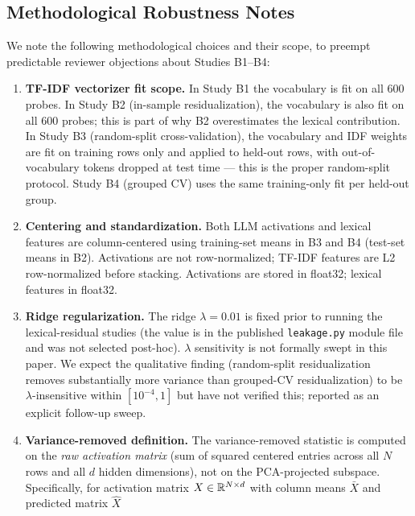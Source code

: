 \subsection{Methodological Robustness Notes}
\label{sec:methods-robustness}

We note the following methodological choices and their scope, to
preempt predictable reviewer objections about Studies B1--B4:

\begin{enumerate}
    \item \textbf{TF-IDF vectorizer fit scope.} In Study B1 the
        vocabulary is fit on all $600$ probes. In Study B2 (in-sample
        residualization), the vocabulary is also fit on all $600$
        probes; this is part of why B2 overestimates the lexical
        contribution. In Study B3 (random-split cross-validation),
        the vocabulary and IDF weights are fit on training rows only
        and applied to held-out rows, with out-of-vocabulary tokens
        dropped at test time --- this is the proper random-split
        protocol. Study B4 (grouped CV) uses the same training-only
        fit per held-out group.
    \item \textbf{Centering and standardization.} Both LLM activations
        and lexical features are column-centered using training-set
        means in B3 and B4 (test-set means in B2). Activations are
        not row-normalized; TF-IDF features are L2 row-normalized
        before stacking. Activations are stored in float32; lexical
        features in float32.
    \item \textbf{Ridge regularization.} The ridge $\lambda = 0.01$
        is fixed prior to running the lexical-residual studies (the
        value is in the published \texttt{leakage.py} module file
        and was not selected post-hoc). $\lambda$ sensitivity is not
        formally swept in this paper. We expect the qualitative
        finding (random-split residualization removes substantially
        more variance than grouped-CV residualization) to be
        $\lambda$-insensitive within $[10^{-4}, 1]$ but have not
        verified this; reported as an explicit follow-up sweep.
    \item \textbf{Variance-removed definition.} The variance-removed
        statistic is computed on the \emph{raw activation matrix}
        (sum of squared centered entries across all $N$ rows and all
        $d$ hidden dimensions), not on the PCA-projected subspace.
        Specifically, for activation matrix $X \in \mathbb{R}^{N \times d}$
        with column means $\bar{X}$ and predicted matrix $\hat{X}$

\end{enumerate}
